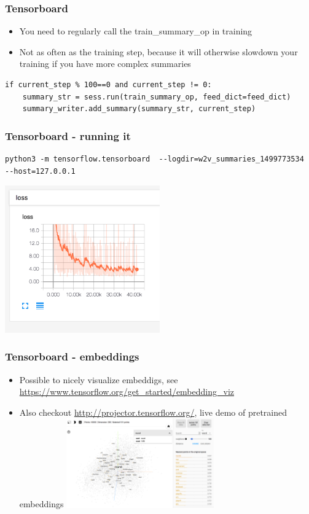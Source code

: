 \documentclass{beamer}
\begin{document}
\begin{frame}[fragile]
 
 \frametitle{Tensorboard}
  \begin{itemize}
		\item You need to regularly call the train\_summary\_op in training
		\item Not as often as the training step, because it will otherwise slowdown your training if you have more complex summaries
	\end{itemize}
			
\begin{tiny}
\begin{lstlisting}
if current_step % 100==0 and current_step != 0:
	summary_str = sess.run(train_summary_op, feed_dict=feed_dict)
	summary_writer.add_summary(summary_str, current_step)
\end{lstlisting}   
\end{tiny}    
	
\end{frame}

\begin{frame}[fragile]
 \frametitle{Tensorboard - running it}
 \begin{tiny}
 \begin{lstlisting}
python3 -m tensorflow.tensorboard  --logdir=w2v_summaries_1499773534
--host=127.0.0.1
\end{lstlisting}   
\end{tiny}
 \includegraphics[width=0.5\textwidth]{04_loss}
\end{frame}


\begin{frame}[fragile]
 \frametitle{Tensorboard - embeddings}
   \begin{itemize}
		\item Possible to nicely visualize embeddigs, see \url{https://www.tensorflow.org/get_started/embedding_viz}
		\item Also checkout \url{http://projector.tensorflow.org/}, live demo of pretrained embeddings
		\includegraphics[width=0.5\textwidth]{04_embed_viz.png}
	\end{itemize}
\end{frame}
\end{document}
